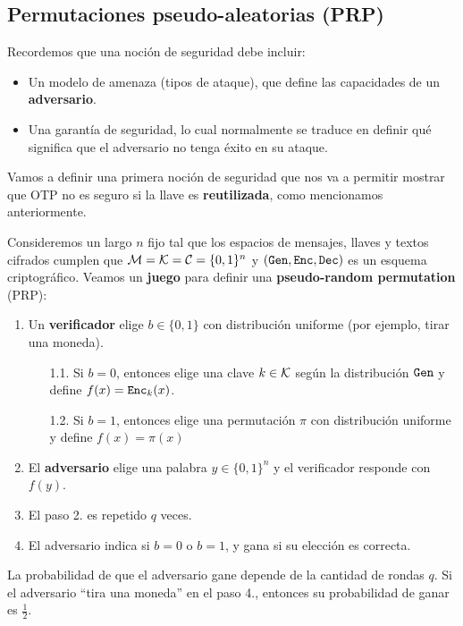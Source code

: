 \subsection{Permutaciones pseudo-aleatorias (PRP)}
Recordemos que una noción de seguridad debe incluir:
\begin{itemize}
    \item Un modelo de amenaza (tipos de ataque), que define las capacidades de un \textbf{adversario}.
    \item Una garantía de seguridad, lo cual normalmente se traduce en definir qué significa que el adversario no tenga éxito en su ataque.
\end{itemize}

Vamos a definir una primera noción de seguridad que nos va a permitir mostrar que OTP no es seguro si la llave es \textbf{reutilizada}, como mencionamos anteriormente. \medbreak

Consideremos un largo $n$ fijo tal que los espacios de mensajes, llaves y textos cifrados cumplen que $\mathcal{M} = \mathcal{K} = \mathcal{C} = \{0,1\}^n$ y $(\texttt{Gen}, \texttt{Enc}, \texttt{Dec})$ es un esquema criptográfico. Veamos un \textbf{juego} para definir una \textbf{pseudo-random permutation} (PRP):
\begin{enumerate}
    \item Un \textbf{verificador} elige $b \in \{0,1\}$ con distribución uniforme (por ejemplo, tirar una moneda).
          \begin{enumerate}
              \item[1.1.] Si $b = 0$, entonces elige una clave $k \in \mathcal{K}$ según la distribución $\texttt{Gen}$ y define $f(x) = \texttt{Enc}_k(x)$.
              \item[1.2.] Si $b = 1$, entonces elige una permutación $\pi$ con distribución uniforme y define $f(x) = \pi(x)$
          \end{enumerate}
    \item El \textbf{adversario} elige una palabra $y \in \{0,1\}^n$ y el verificador responde con $f(y)$.
    \item El paso 2. es repetido $q$ veces.
    \item El adversario indica si $b = 0$ o $b = 1$, y gana si su elección es correcta.
\end{enumerate}

La probabilidad de que el adversario gane depende de la cantidad de rondas $q$. Si el adversario ``tira una moneda'' en el paso 4., entonces su probabilidad de ganar es $\frac{1}{2}$.


